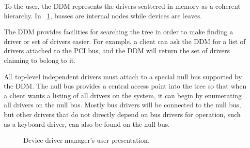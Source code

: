 
To the user, the DDM represents the drivers scattered in memory as a coherent
hierarchy.  In \figurename~\ref{fig:ddm_layout}, busses are internal nodes
while devices are leaves.

The DDM provides facilities for searching the tree in order to make finding
a driver or set of drivers easier.  For example, a client can ask the DDM
for a list of drivers attached to the PCI bus, and the DDM will return the
set of drivers claiming to belong to it.

All top-level independent drivers must attach to a special {\important null
bus} supported by the DDM.  The null bus provides a central access point into
the tree so that when a client wants a listing of all drivers on the
system, it can begin by enumerating all drivers on the null bus.  Mostly
bus drivers will be connected to the null bus, but other drivers that do not
directly depend on bus drivers for operation, such as a keyboard driver, can
also be found on the null bus.

	\begin{figure}[tbp]
	\begin{center}
	\end{center}
	\caption{Device driver manager's user presentation.}
	\label{fig:ddm_layout}
	\end{figure}
